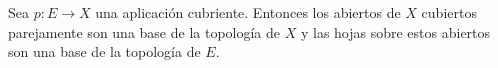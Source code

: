 \begin{ejercicio}
    Sea $p:E\to X$ una aplicación cubriente. Entonces los abiertos de $X$ cubiertos parejamente son una base de la topología de $X$ y las hojas sobre estos abiertos son una base de la topología de $E$.
\end{ejercicio}

\begin{demostracion}

\end{demostracion}
